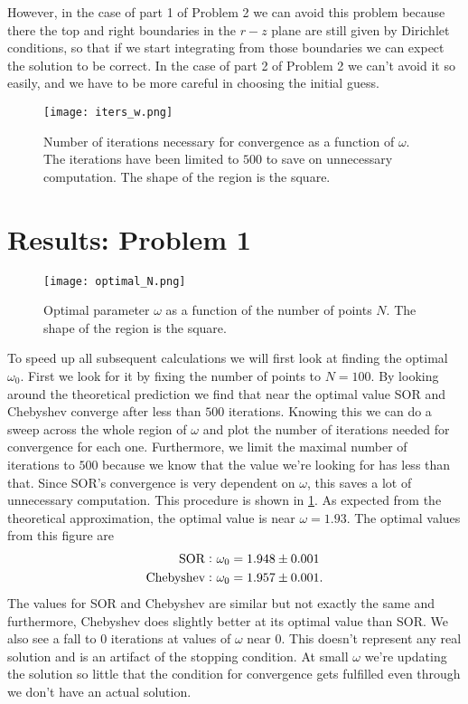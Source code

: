 \documentclass[10pt,a4paper,twocolumn]{article}
\begin{document}
However, in the case of part 1 of Problem 2 we can avoid this problem because there the top and right boundaries in the $r-z$ plane are still given by Dirichlet conditions, so that if we start integrating from those boundaries we can expect the solution to be correct. In the case of part 2 of Problem 2 we can't avoid it so easily, and we have to be more careful in choosing the initial guess.

\begin{figure}[!h]
    \centering
    \texttt{[image: iters\_w.png]}
    \caption{Number of iterations necessary for convergence as a function of $\omega$. The iterations have been limited to $500$ to save on unnecessary computation. The shape of the region is the square.}
    \label{fig:iters_w}
\end{figure}

\section{Results: Problem 1}

\begin{figure}[!h]
    \centering
    \texttt{[image: optimal\_N.png]}
    \caption{Optimal parameter $\omega$ as a function of the number of points $N$. The shape of the region is the square.}
    \label{fig:optimal_N}
\end{figure}

To speed up all subsequent calculations we will first look at finding the optimal $\omega_0$. First we look for it by fixing the number of points to $N=100$. By looking around the theoretical prediction we find that near the optimal value SOR and Chebyshev converge after less than $500$ iterations. Knowing this we can do a sweep across the whole region of $\omega$ and plot the number of iterations needed for convergence for each one. Furthermore, we limit the maximal number of iterations to $500$ because we know that the value we're looking for has less than that. Since SOR's convergence is very dependent on $\omega$, this saves a lot of unnecessary computation. This procedure is shown in \cref{fig:iters_w}. As expected from the theoretical approximation, the optimal value is near $\omega = 1.93$. The optimal values from this figure are
%
\begin{align}
    \mathrm{SOR:}\ \omega_0 &= 1.948 \pm 0.001\notag\\
    \mathrm{Chebyshev:}\ \omega_0 &= 1.957 \pm 0.001.
\end{align}
%
The values for SOR and Chebyshev are similar but not exactly the same and furthermore, Chebyshev does slightly better at its optimal value than SOR. We also see a fall to $0$ iterations at values of $\omega$ near $0$. This doesn't represent any real solution and is an artifact of the stopping condition. At small $\omega$ we're updating the solution so little that the condition for convergence gets fulfilled even through we don't have an actual solution.
\end{document}

